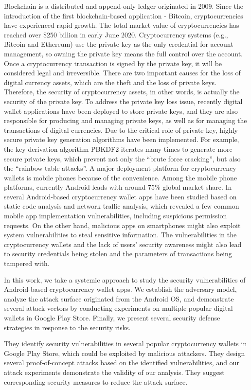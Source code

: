 \documentclass[12pt]{article}
\begin{document}
Blockchain is a distributed and append-only ledger originated in 2009. Since the introduction of the first
blockchain-based application - Bitcoin, cryptocurrencies have
experienced rapid growth. The total market value of cryptocurrencies has reached over \$250 billion in early June 2020.
Cryptocurrency systems (e.g., Bitcoin and Ethereum) use
the private key as the only credential for account management, so owning the private key means the full control over
the account. Once a cryptocurrency transaction is signed by
the private key, it will be considered legal and irreversible.
There are two important causes for the loss of digital currency
assets, which are the theft and the loss of private keys.
Therefore, the security of cryptocurrency assets, in other
words, is actually the security of the private key.
To address the private key loss issue, recently digital wallet
applications have been deployed to store private keys, and
they are also responsible for producing and managing private
keys, as well as for managing the transactions of digital
currencies. Due to the critical role of private key, highly
secure private key generation algorithms have been implemented. For example, the key derivation algorithm PBKDF2
iterates many times to generate more secure private keys,
which prevent not only the “brute force cracking”, but also
the “rainbow table attacks”.
A major deployment platform for cryptocurrency wallets
is mobile phones because of the convenience. Among the
mobile phone platforms, currently Android leads with around
75\% global market share. In several Android-based
cryptocurrency wallet apps have been studied based on static
code analysis and network traffic analysis, which revealed
a few common mobile app implementation vulnerabilities,
including suspicious permission requests. On the other hand,
malicious apps on smartphones might also exploit system
vulnerabilities to steal sensitive information. The vulnerabilities in the cryptocurrency wallets and the lack of users’
security awareness might also lead to security credentials being stolen and the parameters of transactions being tampered
with.
\par
In this work, we take a systemic approach to study the security vulnerabilities of Android-based cryptocurrency wallet
apps. We establish the adversary model, analyze the attack
surface originated from the Android OS, and demonstrate
several attack vectors by conducting experiments on multiple
popular digital wallets in Google Play Store. Finally, we
present several security defense strategies in response to the
security risks.
\par
They identify security vulnerabilities in several popular
cryptocurrency wallets in Google Play Store, which
could be exploited by malicious attackers.
 They design several proof-of-concept attacks based on
the identified vulnerabilities, and our attack experiments
demonstrate the validity of our analysis.
They suggest corresponding security measures to reduce
the attack surface.
\end{document}
